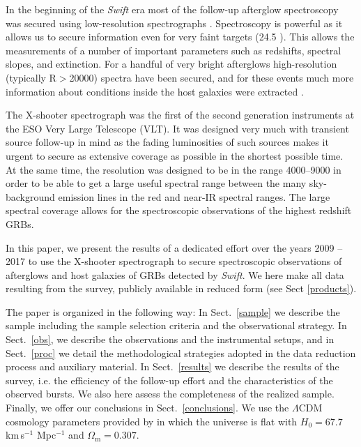 \documentclass{aa}    %
\begin{document}
In the beginning of the {\it Swift} era most of the follow-up afterglow
spectroscopy was secured using low-resolution spectrographs \citep[typically
$R=\lambda/\Delta\lambda$$<$1000, e.g.,][]{Fynbo2009}. Spectroscopy is powerful
as it allows us to secure information even for very faint targets (24.5
\citep{Kruhler2012}). This allows the measurements of a number of important
parameters such as redshifts, spectral slopes, and extinction. For a handful of
very bright afterglows high-resolution (typically R$>$20000) spectra have been
secured, and for these events much more information about conditions inside the
host galaxies were extracted \citep[e.g.,][]{Fiore2005, Thone2007,
	Prochaska2007, Vreeswijk2007, DElia2009, Castro-Tirado2010}.

The X-shooter spectrograph \citep{Vernet2011} was the first of the second
generation instruments at the ESO Very Large Telescope (VLT). It was designed
very much with transient source follow-up in mind as the fading luminosities of
such sources makes it urgent to secure as extensive coverage as possible in the
shortest possible time. At the same time, the resolution was designed to be in
the range 4000--9000 in order to be able to get a large useful spectral range
between the many sky-background emission lines in the red and near-IR spectral
ranges. The large spectral coverage allows for the spectroscopic observations of
the highest redshift GRBs.

In this paper, we present the results of a dedicated effort over the years 2009
-- 2017 to use the X-shooter spectrograph to secure spectroscopic observations
of afterglows and host galaxies of GRBs detected by {\it Swift}. We here make
all data resulting from the survey, publicly available in reduced form (see Sect
\ref{products}).

The paper is organized in the following way: In Sect.~\ref{sample} we describe
the sample including the sample selection criteria and the observational
strategy. In Sect.~\ref{obs}, we describe the observations and the instrumental
setups, and in Sect.~\ref{proc} we detail the methodological strategies adopted
in the data reduction process and auxiliary material. In Sect.~\ref{results} we
describe the results of the survey, i.e. the efficiency of the follow-up effort
and the characteristics of the observed bursts. We also here assess the
completeness of the realized sample. Finally, we offer our conclusions
in Sect.~\ref{conclusions}. We use the $\Lambda$CDM cosmology parameters
provided by \citet{Planck2015} in which the universe is flat with $H_0 =
67.7$\,km\,s$^{-1}$ Mpc$^{-1}$ and $\Omega_\mathrm{m} = 0.307$.
\end{document}
